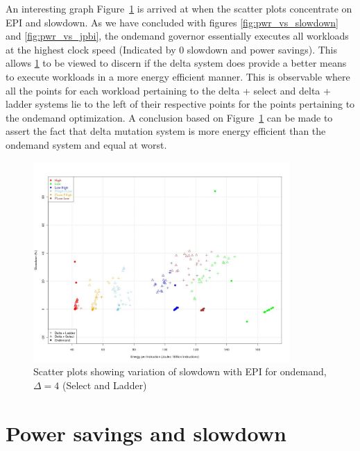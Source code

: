 An interesting graph Figure~\ref{fig:jpbi_vs_slowdown} is arrived at when the scatter plots concentrate on
EPI and slowdown. As we have concluded with figures \ref{fig:pwr_vs_slowdown} and \ref{fig:pwr_vs_jpbi},
the ondemand governor essentially executes all workloads at the highest clock speed (Indicated by 0 slowdown 
and power savings). This allows \ref{fig:jpbi_vs_slowdown} to be viewed to discern if the delta system
does provide a better means to execute workloads in a more energy efficient manner. This is observable
where all the points for each workload pertaining to the delta + select and delta + ladder systems lie to the left of their
respective points for the points pertaining to the ondemand optimization. A conclusion based on 
Figure~\ref{fig:jpbi_vs_slowdown} can be made to assert the fact that delta mutation system is more 
energy efficient than the ondemand system and equal at worst.

\begin{figure}[h!]
  \begin{center}
    \includegraphics[height=3.0in]{figures/jpbi_vs_slowdown_delta_4.jpg}%
    \caption{Scatter plots showing variation of slowdown with EPI for ondemand, $\Delta=4$ (Select and Ladder)}
    \label{fig:jpbi_vs_slowdown}
  \end{center}
\end{figure}

\section{Power savings and slowdown}~\label{sec:pow_slow}

